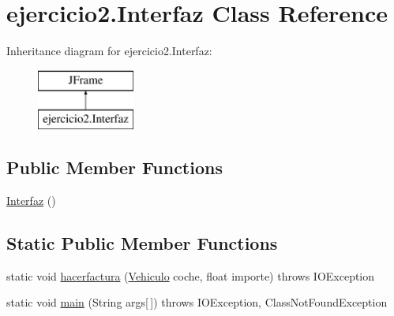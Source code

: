 \hypertarget{classejercicio2_1_1_interfaz}{}\section{ejercicio2.\+Interfaz Class Reference}
\label{classejercicio2_1_1_interfaz}
Inheritance diagram for ejercicio2.\+Interfaz\+:\begin{figure}[H]
\begin{center}
\leavevmode
\includegraphics[height=2.000000cm]{classejercicio2_1_1_interfaz}
\end{center}
\end{figure}
\subsection*{Public Member Functions}
\begin{DoxyCompactItemize}
\item 
\mbox{\hyperlink{classejercicio2_1_1_interfaz_a4fd3bce20b745d1b20a97b7ee776f843}{Interfaz}} ()
\end{DoxyCompactItemize}
\subsection*{Static Public Member Functions}
\begin{DoxyCompactItemize}
\item 
static void \mbox{\hyperlink{classejercicio2_1_1_interfaz_ad1c1f7ae89fa8b274efa4af145b479ab}{hacerfactura}} (\mbox{\hyperlink{classejercicio2_1_1_vehiculo}{Vehiculo}} coche, float importe)  throws I\+O\+Exception
\item 
static void \mbox{\hyperlink{classejercicio2_1_1_interfaz_a0125ded86293cad4199da328fd7cc956}{main}} (String args\mbox{[}$\,$\mbox{]})  throws I\+O\+Exception, Class\+Not\+Found\+Exception
\end{DoxyCompactItemize}

